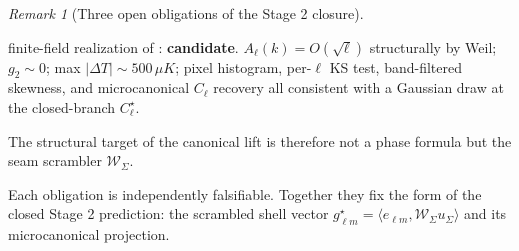 \documentclass[11pt,a4paper]{article}
\theoremstyle{definition}
\theoremstyle{remark}
\newtheorem*{remark}{Remark}
\begin{document}
\begin{remark}[Three open obligations of the Stage 2 closure]
\begin{enumerate}[label=(O\arabic*),leftmargin=2.4em,topsep=3pt,itemsep=2pt]
\begin{enumerate}[label=(\alph*),leftmargin=2em,topsep=2pt,itemsep=1pt]
finite-field realization of : \textbf{candidate}.
$A_\ell(k)=O(\sqrt{\ell})$ structurally by Weil; $g_2\sim 0$; max $|\Delta T|\sim 500\,\mu K$;
pixel histogram, per-$\ell$ KS test, band-filtered skewness, and microcanonical $C_\ell$ recovery
all consistent with a Gaussian draw at the closed-branch $C_\ell^\star$.
\end{enumerate}
The structural target of the canonical lift is therefore not a phase formula but the seam
scrambler $\mathcal W_\Sigma$.
\end{enumerate}
Each obligation is independently falsifiable. Together they fix the form of the closed Stage 2
prediction: the scrambled shell vector
\(g_{\ell m}^{\star}=\langle e_{\ell m},\mathcal W_\Sigma u_\Sigma\rangle\)
and its microcanonical projection.
\end{remark}
\end{document}
